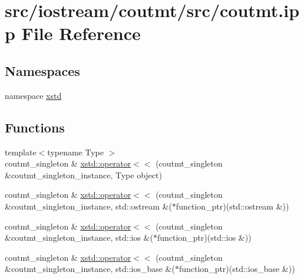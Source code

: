 \hypertarget{coutmt_8ipp}{\section{src/iostream/coutmt/src/coutmt.ipp File Reference}
\label{coutmt_8ipp}
}
\subsection*{Namespaces}
\begin{DoxyCompactItemize}
\item 
namespace \hyperlink{namespacexstd}{xstd}
\end{DoxyCompactItemize}
\subsection*{Functions}
\begin{DoxyCompactItemize}
\item 
{\footnotesize template$<$typename Type $>$ }\\coutmt\-\_\-singleton \& \hyperlink{namespacexstd_a1e84f1aca8ea660c6b6857dd74e23095}{xstd\-::operator$<$$<$} (coutmt\-\_\-singleton \&coutmt\-\_\-singleton\-\_\-instance, Type object)
\item 
coutmt\-\_\-singleton \& \hyperlink{namespacexstd_a4ca9ff5b467cc2d187627f25fe4becb9}{xstd\-::operator$<$$<$} (coutmt\-\_\-singleton \&coutmt\-\_\-singleton\-\_\-instance, std\-::ostream \&($\ast$function\-\_\-ptr)(std\-::ostream \&))
\item 
coutmt\-\_\-singleton \& \hyperlink{namespacexstd_ae5a5bddbedf675617d11176fea8fee8b}{xstd\-::operator$<$$<$} (coutmt\-\_\-singleton \&coutmt\-\_\-singleton\-\_\-instance, std\-::ios \&($\ast$function\-\_\-ptr)(std\-::ios \&))
\item 
coutmt\-\_\-singleton \& \hyperlink{namespacexstd_a05baea78d624e383708fa5f4ba944f8e}{xstd\-::operator$<$$<$} (coutmt\-\_\-singleton \&coutmt\-\_\-singleton\-\_\-instance, std\-::ios\-\_\-base \&($\ast$function\-\_\-ptr)(std\-::ios\-\_\-base \&))
\end{DoxyCompactItemize}
